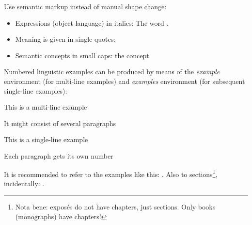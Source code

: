 \documentclass[naustrian,english]{univie-ling-expose}
\begin{document}
Use semantic markup instead of manual shape change:
\begin{itemize}
	\item Expressions (object language) in italics: The word .
	\item Meaning is given in single quotes: 
	\item Semantic concepts in small caps: the concept 
\end{itemize}
%
Numbered linguistic examples can be produced by means of the \emph{example} environment (for multi-line examples) and \emph{examples} environment
(for subsequent single-line examples):

\begin{example}
	This is a multi-line example
	
	It might consist of several paragraphs
\end{example}

\begin{examples}
	\item This is a single-line example\label{exa:example-single}
	\item Each paragraph gets its own number
\end{examples}
%
It is recommended to refer to the examples like this: . Also to sections\footnote{Nota bene: exposés do not have chapters,
	just sections. Only books (monographs) have chapters!}, incidentally: .


\printbibliography[heading=bibnumbered]
\end{document}
